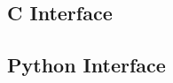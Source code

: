 \documentclass{book}
\begin{document}
\begin{cpdflib}
\clearpage
\section*{C Interface}
\begin{small}\tt

\end{small}
\end{cpdflib}

\begin{pycpdflib}
\clearpage
\section*{Python Interface}
\begin{small}\tt

\end{small}
\end{pycpdflib}

\clearpage\pagestyle{empty}
\end{document}
